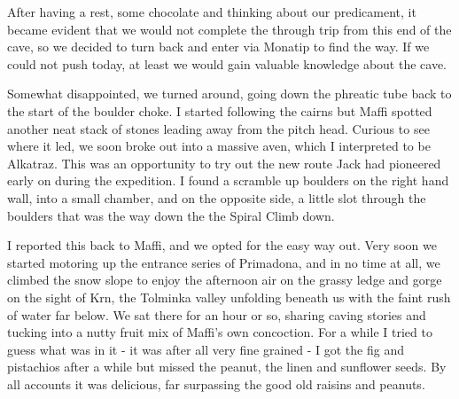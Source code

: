 After having a rest, some chocolate and thinking about our predicament, it became evident that we would not complete the through trip from this end of the cave, so we decided to turn back and enter via Monatip to find the way. If we could not push today, at least we would gain valuable knowledge about the cave. 

Somewhat disappointed, we turned around, going down the phreatic tube back to the start of the boulder choke. I started following the cairns but Maffi spotted another neat stack of stones leading away from the pitch head. Curious to see where it led, we soon broke out into a massive aven, which I interpreted to be Alkatraz. This was an opportunity to try out the new route Jack had pioneered early on during the expedition. I found a scramble up boulders on the right hand wall, into a small chamber, and on the opposite side, a little slot through the boulders that was the way down the the Spiral Climb down. 

I reported this back to Maffi, and we opted for the easy way out. Very soon we started motoring up the entrance series of Primadona, and in no time at all, we climbed the snow slope to enjoy the afternoon air on the grassy ledge and gorge on the sight of Krn, the Tolminka valley unfolding beneath us with the faint rush of water far below. We sat there for an hour or so, sharing caving stories and tucking into a nutty fruit mix of Maffi’s own concoction. For a while I tried to guess what was in it - it was after all very fine grained - I got the fig and pistachios after a while but missed the peanut, the linen and sunflower seeds. By all accounts it was delicious, far surpassing the good old raisins and peanuts. 

